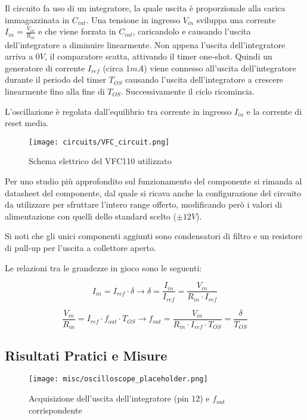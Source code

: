 Il circuito fa uso di un integratore, la quale uscita è proporzionale alla carica immagazzinata
in $C_{int}$. Una tensione in ingresso $V_{in}$ sviluppa una corrente $I_{in}=\frac{V_{in}}{R_{in}}$
e che viene forzata in $C_{int}$, caricandolo e causando l'uscita dell'integratore a diminuire
linearmente. Non appena l'uscita dell'integratore arriva a $0V$, il comparatore scatta, attivando
il timer one-shot. Quindi un generatore di corrente $I_{ref}$ (circa $1mA$) viene connesso
all'uscita dell'integratore durante il periodo del timer $T_{OS}$ causando l'uscita dell'integratore
a crescere linearmente fino alla fine di $T_{OS}$. Successivamente il ciclo ricomincia.

L'oscillazione è regolata dall'equilibrio tra corrente in ingresso $I_{in}$ e la corrente di
reset media.
\medskip

\begin{figure}[ht]
    \centering
    \texttt{[image: circuits/VFC\_circuit.png]}
    \caption{Schema elettrico del VFC110 utilizzato}
    \label{VFC_circuit}
\end{figure}

Per uno studio più approfondito sul funzionamento del componente si rimanda al datasheet
del componente, dal quale si ricava anche la configurazione del circuito da utilizzare
per sfruttare l'intero range offerto, modificando però i valori di alimentazione con
quelli dello standard scelto ($\pm 12V$).
\medskip


Si noti che gli unici componenti aggiunti sono condensatori di filtro e un resistore di
pull-up per l'uscita a collettore aperto.

Le relazioni tra le grandezze in gioco sono le seguenti:

$$
    I_{in}=I_{ref}\cdot\delta
    \rightarrow
    \delta=\frac{I_{in}}{I_{ref}}=\frac{V_{in}}{R_{in}\cdot I_{ref}}
$$

$$
    \frac{V_{in}}{R_{in}}=I_{ref}\cdot f_{out}\cdot T_{OS}
    \rightarrow
    f_{out}=\frac{V_{in}}{R_{in}\cdot I_{ref}\cdot T_{OS}}=\frac{\delta}{T_{OS}}
$$


\subsection*{Risultati Pratici e Misure}



\begin{figure}[ht]
    \centering
    \texttt{[image: misc/oscilloscope\_placeholder.png]}
    \caption{Acquisizione dell'uscita dell'integratore (pin 12) e $f_{out}$ corrispondente}
    \label{acq_vfc110}
\end{figure}


